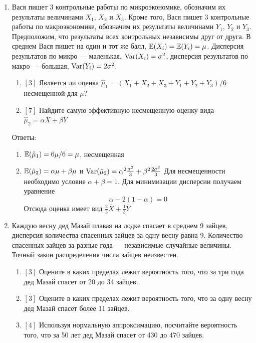 \documentclass[12pt, a4paper]{article}\usepackage[]{graphicx}\usepackage[]{color}
\begin{document}
\begin{enumerate}
			\item Вася пишет 3 контрольные работы по микроэкономике, обозначим их результаты величинами $X_1$, $X_2$ и $X_3$. Кроме того, Вася пишет 3 контрольные работы по макроэкономике, обозначим их результаты величинами $Y_1$, $Y_2$ и $Y_3$. Предположим, что результаты всех контрольных независимы друг от друга. В среднем Вася пишет на один и тот же балл, $\mathbb{E}(X_i)=\mathbb{E}(Y_i)=\mu$. Дисперсия результатов по микро — маленькая, $\operatorname{Var}(X_i)=\sigma^2$, дисперсия результатов по макро — большая, $\operatorname{Var}(Y_i)=2\sigma^2$.
			\begin{enumerate}
				\item $[3]$ Является ли оценка $\hat{\mu}_1=(X_1+X_2+X_3+Y_1+Y_2+Y_3)/6$ несмещенной для $\mu$?
				\item $[7]$ Найдите самую эффективную несмещенную оценку вида $\hat{\mu}_2=\alpha \bar{X}+\beta \bar{Y}$
			\end{enumerate}

			Ответы:
			\begin{enumerate}
				\item $\mathbb{E}(\hat{\mu}_1)=6\mu/6=\mu$, несмещенная
				\item $\mathbb{E}(\hat{\mu}_2)=\alpha \mu+\beta \mu$ и $\operatorname{Var}(\hat{\mu}_2)=\alpha^2 \frac{\sigma^2}{3}+\beta^2 \frac{2\sigma^2}{3}$
				Для несмещенности необходимо условие $\alpha+\beta=1$. Для минимизации дисперсии получаем уравнение
				\begin{equation}
				\alpha-2(1-\alpha)=0
				\end{equation}
				Отсюда оценка имеет вид $\frac{2}{3}\bar{X}+\frac{1}{3}\bar{Y}$
			\end{enumerate}


			\item Каждую весну дед Мазай плавая на лодке спасает в среднем 9 зайцев, дисперсия количества спасенных зайцев за одну весну равна 9. Количество спасенных зайцев за разные года — независимые случайные величины. Точный закон распределения числа зайцев неизвестен.
			\begin{enumerate}
				\item $[3]$ Оцените в каких пределах лежит вероятность того, что за три года дед Мазай спасет от 20 до 34 зайцев.
				\item $[3]$ Оцените в каких пределах лежит вероятность того, что за одну весну дед Мазай спасет более 11 зайцев.
				\item $[4]$ Используя нормальную аппроксимацию, посчитайте вероятность того, что за 50 лет дед Мазай спасет от 430 до 470 зайцев.
			\end{enumerate}


\end{enumerate}
\end{document}
